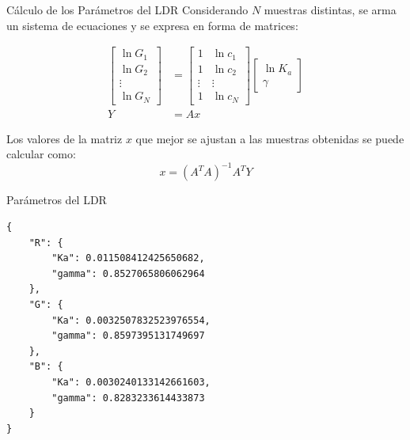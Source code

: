 \documentclass[10pt]{beamer}
\begin{document}
\begin{frame}{Cálculo de los Parámetros del LDR}
Considerando $N$ muestras distintas, se arma un sistema de ecuaciones y se expresa en forma de matrices:

\begin{align*}
    \begin{bmatrix}
        \ln G_1    \\
        \ln G_2    \\
        \vdots \\
        \ln G_N
    \end{bmatrix}
    &=
    \begin{bmatrix}
        1      & \ln c_1 \\
        1      & \ln c_2 \\
        \vdots & \vdots  \\
        1      & \ln c_N
    \end{bmatrix}
    \begin{bmatrix}
        \ln K_a \\
        \gamma
    \end{bmatrix}
    \\
    Y &= A x
\end{align*}

Los valores de la matriz $x$ que mejor se ajustan a las muestras obtenidas se puede calcular como:
\begin{equation} \label{eq:LSQ_formula}
    x = {(A^T A)}^{-1} A^T Y
\end{equation}

\end{frame}

\begin{frame}[fragile]{Parámetros del LDR}
\begin{lstlisting}
{
    "R": {
        "Ka": 0.011508412425650682,
        "gamma": 0.8527065806062964
    },
    "G": {
        "Ka": 0.0032507832523976554,
        "gamma": 0.8597395131749697
    },
    "B": {
        "Ka": 0.0030240133142661603,
        "gamma": 0.8283233614433873
    }
}
\end{lstlisting}
\end{frame}
\end{document}

